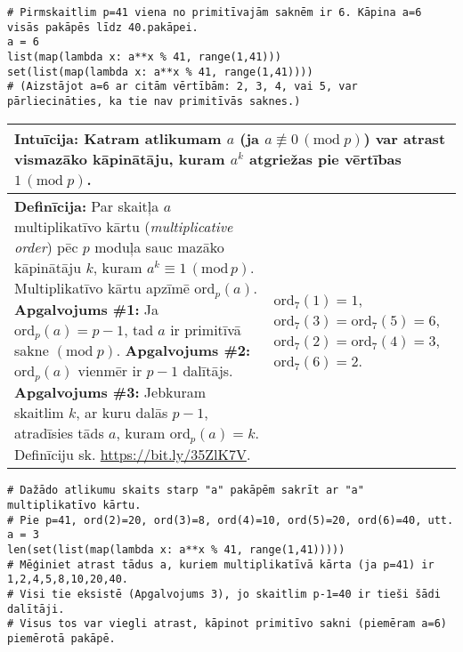 \documentclass[a4paper]{article}
\begin{document}
{\small
\vspace{-10pt}
\begin{Verbatim}
# Pirmskaitlim p=41 viena no primitīvajām saknēm ir 6. Kāpina a=6 visās pakāpēs līdz 40.pakāpei.
a = 6
list(map(lambda x: a**x % 41, range(1,41)))
set(list(map(lambda x: a**x % 41, range(1,41))))
# (Aizstājot a=6 ar citām vērtībām: 2, 3, 4, vai 5, var pārliecināties, ka tie nav primitīvās saknes.)
\end{Verbatim}
}

\vspace{-10pt}
\renewcommand{\arraystretch}{1.2}
\begin{table}[ht!]\centering
{\small
\begin{tabular*}{18.46cm}{@{}|p{10.35cm}|p{7.25cm}|@{}} \hline
\multicolumn{2}{|p{18.05cm}|}{
\cellcolor[HTML]{E1FFE1}
Intuīcija: Katram atlikumam $a$ (ja $a \not\equiv 0\,(\text{mod}\;p)$) var atrast vismazāko kāpinātāju, 
kuram $a^k$ atgriežas pie vērtības $1\,(\text{mod}\;p)$.
} \\ \hline
{\bf Definīcija:} Par skaitļa $a$ multiplikatīvo kārtu ({\em multiplicative order}) 
pēc $p$ moduļa sauc mazāko kāpinātāju $k$, kuram $a^k \equiv 1\,(\text{mod}\,p)$.\newline
Multiplikatīvo kārtu apzīmē $\text{ord}_p(a)$.\newline
{\bf Apgalvojums \#1:} Ja $\text{ord}_p(a) = p-1$, tad $a$ ir primitīvā sakne $(\text{mod}\;p)$.\newline
{\bf Apgalvojums \#2:} $\text{ord}_p(a)$ vienmēr ir $p-1$ dalītājs.\newline
{\bf Apgalvojums \#3:} Jebkuram skaitlim $k$, ar kuru dalās $p-1$, atradīsies tāds $a$, kuram $\text{ord}_p(a) = k$.\newline
Definīciju sk. \url{https://bit.ly/35ZlK7V}.
 &
$\text{ord}_7(1) = 1$,\newline
$\text{ord}_7(3) = \text{ord}_7(5) = 6$,\newline
$\text{ord}_7(2) = \text{ord}_7(4) = 3$,\newline
$\text{ord}_7(6) = 2$.
\\ \hline
\end{tabular*}
}
\end{table}

{\small
\vspace{-10pt}
\begin{Verbatim}
# Dažādo atlikumu skaits starp "a" pakāpēm sakrīt ar "a" multiplikatīvo kārtu. 
# Pie p=41, ord(2)=20, ord(3)=8, ord(4)=10, ord(5)=20, ord(6)=40, utt.
a = 3
len(set(list(map(lambda x: a**x % 41, range(1,41)))))
# Mēģiniet atrast tādus a, kuriem multiplikatīvā kārta (ja p=41) ir 1,2,4,5,8,10,20,40. 
# Visi tie eksistē (Apgalvojums 3), jo skaitlim p-1=40 ir tieši šādi dalītāji.
# Visus tos var viegli atrast, kāpinot primitīvo sakni (piemēram a=6) piemērotā pakāpē.
\end{Verbatim}
}
\end{document}
